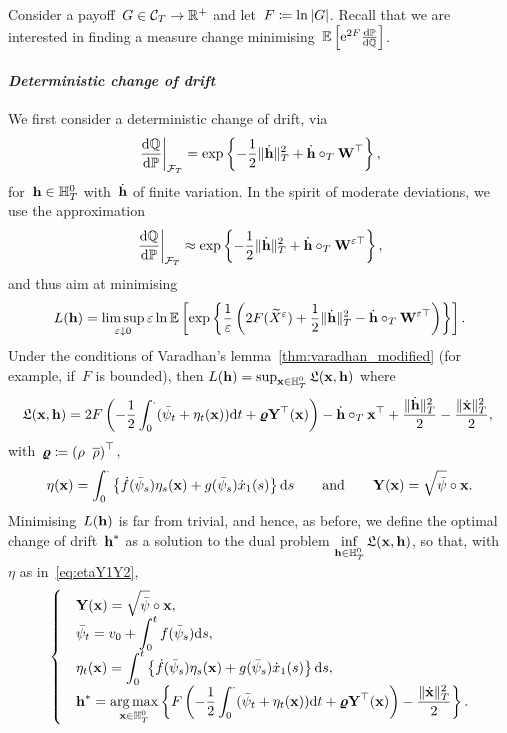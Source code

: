 Consider a payoff~$G\in\Cc_T\rightarrow\RR^{+}$ and let~$F\defEqual\nobreak\ln|G|$. 
Recall that we are interested in finding a measure change minimising~$\EE\left[\E^{2F}\frac{\D\PP}{\D\QQ}\right]$.\\

\paragraph{\textit{Deterministic change of drift}}
We first consider a deterministic change of drift, via 
\[
\left.\frac{\D\QQ}{\D\PP}\right\vert_{\Ff_T} = \exp\left\{-\frac{1}{2}\|\dot{\hh}\|_{T}^2 + \dot{\hh}\cT \Wf^\top\right\},
\]
for~$\hh \in \HH_T^0$ with~$\dot{\hh}$ of finite variation. 
In the spirit of moderate deviations, we use the approximation 
\[
\left.\frac{\D\QQ}{\D\PP}\right\vert_{\Ff_T} \approx \exp\left\{-\frac{1}{2}\|\dot{\hh}\|_{T}^2 + \dot{\hh}\cT \Wf^{\eps\top}\right\},
\]
and thus aim at minimising
\[
L(\hh) = \limsup\limits_{\eps \downarrow 0} \eps\ln\EE\left[\exp\left\{\frac{1}{\eps}\left(
2F(\widetilde{X}^\eps) + \frac{1}{2}\|\dot{\hh}\|_{T}^2 - \dot{\hh}\cT \Wf^{\eps\top}\right)\right\}\right].
\]
Under the conditions of Varadhan's lemma~\ref{thm:varadhan_modified} 
(for example, if~$F$ is bounded), then
$L(\hh) =\nobreak \sup_{\xx \in \HH_T^0} \Lf(\xx,\hh)$ where
$$
\Lf(\xx,\hh)
 = 2 F\left(-\frac{1}{2}\int_0^.(\bar\psi_t + \eta_t(\xx))\D t + \vrho\Yf^\top(\xx) \right) - \dot{\hh}\cT\xx^\top + \frac{\|\dot{\hh}\|_{T}^2}{2} - \frac{\|\dot{\xx}\|_{T}^2}{2},
~$$
with~$\vrho \defEqual \left(\rho \;\; \brho\right)^\top$,
\begin{equation}\label{eq:etaY1Y2}
\eta(\xx) = \int_0^\cdot\left\{\dot{f}(\bar\psi_s)\eta_s(\xx) + g(\bar\psi_s)\dot{x}_1(s)\right\}\D s
\qquad\text{and}\qquad
\Yf(\xx) = \sqrt{\bar\psi}\circ \xx.
\end{equation}
Minimising~$L(\hh)$ is far from trivial, 
and hence, as before, we define the optimal change of drift~$\hh^{*}$ as a solution to the dual problem
$\inf\limits_{\hh \in \HH_T^0}\Lf(\xx,\hh)$,
so that, with~$\eta$ as in~\eqref{eq:etaY1Y2},
\begin{equation}\label{eq:optidetdrift}
\begin{cases}
&\displaystyle \Yf(\xx) = \sqrt{\bar\psi}\circ \xx, \\
&\displaystyle \bar\psi_t = v_0 + \int_0^t f(\bar\psi_s)\D s, \\
&\displaystyle \eta_t(\xx) = \int_0^t\left\{\dot{f}(\bar\psi_s)\eta_s(\xx) + g(\bar\psi_s)\dot{x}_1(s)\right\}\D s, \\
&\displaystyle \hh^{*} = \argmax\limits_{\xx \in \HH_T^0} \left\{F\left(-\frac{1}{2}\int_0^\cdot(\bar\psi_t + \eta_t(\xx))\D t + \vrho\Yf^\top(\xx)\right)- \frac{\|\dot{\xx}\|_{T}^2}{2}\right\}.
\end{cases}
\end{equation}
